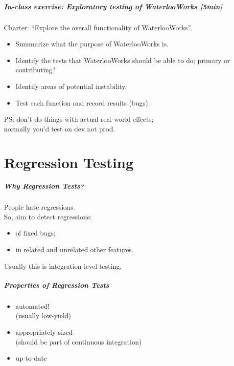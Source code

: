 \documentclass{beamer}
\newenvironment{changemargin}[1]{%
  \begin{list}{}{%
    \setlength{\topsep}{0pt}%
    \setlength{\leftmargin}{#1}%
    \setlength{\rightmargin}{1em}
    \setlength{\listparindent}{\parindent}%
    \setlength{\itemindent}{\parindent}%
    \setlength{\parsep}{\parskip}%
  }%
  \item[]}{\end{list}}
\begin{document}
\begin{frame}
  \frametitle{In-class exercise: Exploratory testing of WaterlooWorks [5min]}
  \begin{changemargin}{2em}
    Charter: ``Explore the overall functionality of WaterlooWorks''.
    \begin{itemize}
    \item Summarize what the purpose of WaterlooWorks is.
    \item Identify the tests that WaterlooWorks should be able to do; primary or contributing?
    \item Identify areas of potential instability.
    \item Test each function and record results (bugs).
    \end{itemize}
    PS: don't do things with actual real-world effects; \\
    normally you'd test on dev not prod.
  \end{changemargin}
\end{frame}

\part{Regression Testing}
\begin{frame}
  \partpage
\end{frame}

\begin{frame}
  \frametitle{Why Regression Tests?}
  \begin{changemargin}{2em}
    \Large
    People hate regressions. \\
    So, aim to detect regressions:
    \begin{itemize}
\item of fixed bugs;
\item in related and unrelated other features.\\[1em]
    \end{itemize}
    Usually this is integration-level testing.
  \end{changemargin}
\end{frame}

\begin{frame}
  \frametitle{Properties of Regression Tests}
  \begin{changemargin}{1em}
    \Large
    \begin{itemize}
    \item automated! \\ \qquad (usually low-yield)
    \item appropriately sized\\ \qquad (should be part of continuous integration)
    \item up-to-date
    \end{itemize}
  \end{changemargin}
\end{frame}
\end{document}
